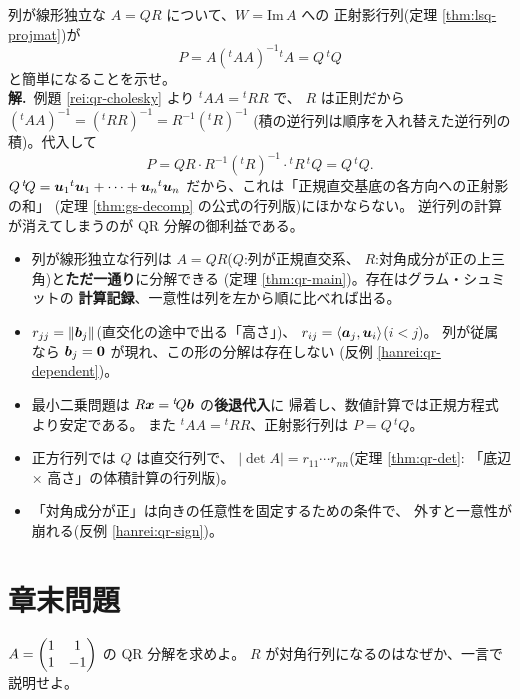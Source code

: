 \begin{rei}[例題・標準(証明:正射影行列は $Q\,{}^t\!Q$)]\label{rei:qr-proj}
列が線形独立な $A = QR$ について、$W = \mathrm{Im}\,A$ への
正射影行列(定理 \ref{thm:lsq-projmat})が
\[
P = A({}^t\!AA)^{-1}{}^t\!A = Q\,{}^t\!Q
\]
と簡単になることを示せ。\\
\textbf{解.}\ 例題 \ref{rei:qr-cholesky} より ${}^t\!AA = {}^t\!RR$ で、
$R$ は正則だから $({}^t\!AA)^{-1} = ({}^t\!RR)^{-1} = R^{-1}({}^t\!R)^{-1}$
(積の逆行列は順序を入れ替えた逆行列の積)。代入して
\[
P = QR \cdot R^{-1}({}^t\!R)^{-1} \cdot {}^t\!R\,{}^t\!Q = Q\,{}^t\!Q.
\]
$Q\,{}^t\!Q = \bm{u}_1{}^t\bm{u}_1 + \cdots + \bm{u}_n{}^t\bm{u}_n$
だから、これは「正規直交基底の各方向への正射影の和」
(定理 \ref{thm:gs-decomp} の公式の行列版)にほかならない。
逆行列の計算が消えてしまうのが QR 分解の御利益である。
\end{rei}

\begin{matome}
\begin{itemize}
\item 列が線形独立な行列は $A = QR$($Q$:列が正規直交系、
$R$:対角成分が正の上三角)と\textbf{ただ一通り}に分解できる
(定理 \ref{thm:qr-main})。存在はグラム・シュミットの
\textbf{計算記録}、一意性は列を左から順に比べれば出る。
\item $r_{jj} = \|\bm{b}_j\|$(直交化の途中で出る「高さ」)、
$r_{ij} = \langle \bm{a}_j, \bm{u}_i \rangle$($i < j$)。
列が従属なら $\bm{b}_j = \bm{0}$ が現れ、この形の分解は存在しない
(反例 \ref{hanrei:qr-dependent})。
\item 最小二乗問題は $R\bm{x} = {}^t\!Q\bm{b}$ の\textbf{後退代入}に
帰着し、数値計算では正規方程式より安定である。
また ${}^t\!AA = {}^t\!RR$、正射影行列は $P = Q\,{}^t\!Q$。
\item 正方行列では $Q$ は直交行列で、
$|\det A| = r_{11}\cdots r_{nn}$(定理 \ref{thm:qr-det}:
「底辺 × 高さ」の体積計算の行列版)。
\item 「対角成分が正」は向きの任意性を固定するための条件で、
外すと一意性が崩れる(反例 \ref{hanrei:qr-sign})。
\end{itemize}
\end{matome}

\section*{章末問題}

\begin{mondai}[基本]\label{q:qr-ex1}
$A = \begin{pmatrix}1 & 1 \\ 1 & -1\end{pmatrix}$ の QR 分解を求めよ。
$R$ が対角行列になるのはなぜか、一言で説明せよ。
\end{mondai}

